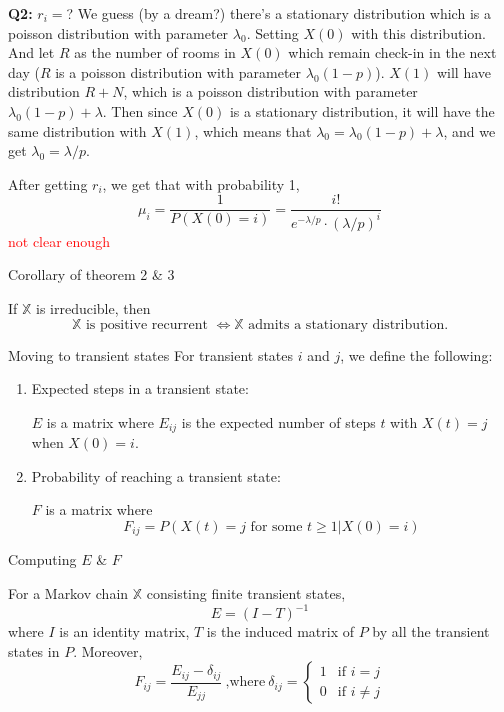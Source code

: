 \documentclass[mathserif]{beamer}
\begin{document}
\begin{frame}{\textbf{Q2:} $r_i =$?}
	We guess (by a dream?) there's a stationary distribution which is a poisson distribution with parameter $\lambda_0$.
	Setting $X(0)$ with this distribution. 
	And let $R$ as the number of rooms in $X(0)$ which remain check-in in the next day ($R$ is a poisson distribution with parameter $\lambda_0 (1-p)$).
	$X(1)$ will have distribution $R + N$, which is a poisson distribution with parameter $\lambda_0 (1-p) + \lambda$.
	Then since $X(0)$ is a stationary distribution, it will have the same distribution with $X(1)$, which means that $\lambda_0 = \lambda_0 (1-p) + \lambda$, and we get $\lambda_0 = \lambda / p$.
	
	After getting $r_i$, we get that with probability 1, 
	\[
	\mu_i = \frac{1}{P(X(0)=i)} = \frac{i!}{e^{-\lambda/p}\cdot (\lambda/p)^i}
	\]
	\textcolor{red}{not clear enough}
\end{frame}

\begin{frame}{Corollary of theorem 2 \& 3}
\begin{corollary}
If $\mathbb{X}$ is irreducible, then
\[
\text{$\mathbb{X}$ is positive recurrent $\iff \mathbb{X}$ admits a stationary distribution.}
\]
\end{corollary}
\end{frame}

\begin{frame}{Moving to transient states}
For transient states $i$ and $j$, we define the following:
\begin{enumerate}
\item Expected steps in a transient state:
	\begin{definition}
	$E$ is a matrix where $E_{ij}$ is the expected number of steps $t$ with $X(t) = j$ when $X(0)=i$.
	\end{definition}
\item Probability of reaching a transient state:
	\begin{definition}
	$F$ is a matrix where
	\[
	F_{ij} = P(X(t)=j \text{ for some } t \geq 1 | X(0)=i)
	\]
	\end{definition}
\end{enumerate}
\end{frame}

\begin{frame}{Computing $E$ \& $F$}
\begin{theorem}
For a Markov chain $\mathbb{X}$ consisting finite transient states,
\[
E = (I - T)^{-1}
\]
where $I$ is an identity matrix, $T$ is the induced matrix of $P$ by all the transient states in $P$.
Moreover,
\[
F_{ij} = \frac{E_{ij} - \delta_{ij}}{E_{jj}} ~\text{,where}~ \delta_{ij}=
\begin{cases}
1 & \text{if } i=j \\
0 & \text{if } i \neq j
\end{cases}
\]
\end{theorem}
\end{frame}
\end{document}
